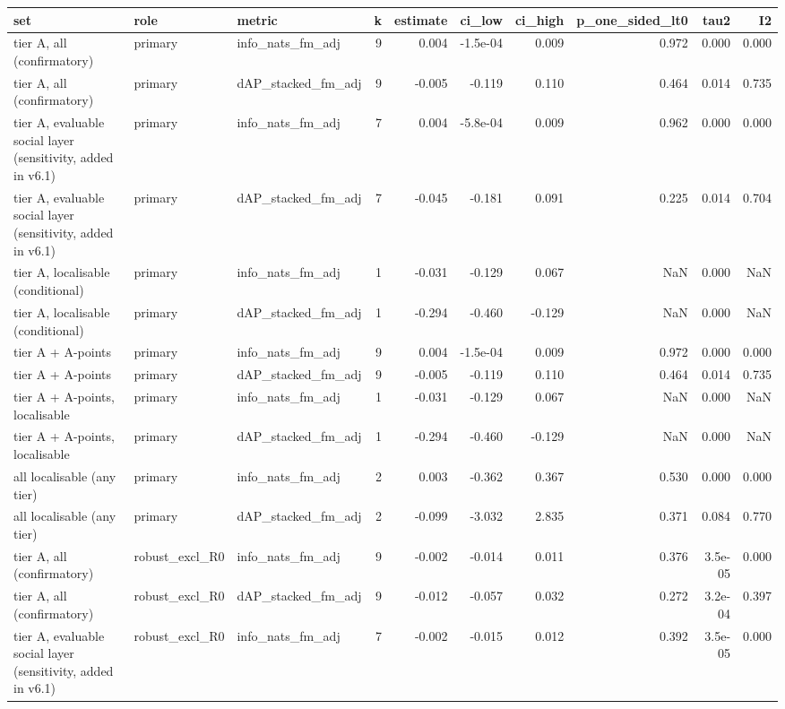 \begin{tabular}{lllrrrrrrr}
\toprule
set & role & metric & k & estimate & ci_low & ci_high & p_one_sided_lt0 & tau2 & I2 \\
\midrule
tier A, all (confirmatory) & primary & info\_nats\_fm\_adj & 9 & 0.004 & -1.5e-04 & 0.009 & 0.972 & 0.000 & 0.000 \\
tier A, all (confirmatory) & primary & dAP\_stacked\_fm\_adj & 9 & -0.005 & -0.119 & 0.110 & 0.464 & 0.014 & 0.735 \\
tier A, evaluable social layer (sensitivity, added in v6.1) & primary & info\_nats\_fm\_adj & 7 & 0.004 & -5.8e-04 & 0.009 & 0.962 & 0.000 & 0.000 \\
tier A, evaluable social layer (sensitivity, added in v6.1) & primary & dAP\_stacked\_fm\_adj & 7 & -0.045 & -0.181 & 0.091 & 0.225 & 0.014 & 0.704 \\
tier A, localisable (conditional) & primary & info\_nats\_fm\_adj & 1 & -0.031 & -0.129 & 0.067 & NaN & 0.000 & NaN \\
tier A, localisable (conditional) & primary & dAP\_stacked\_fm\_adj & 1 & -0.294 & -0.460 & -0.129 & NaN & 0.000 & NaN \\
tier A + A-points & primary & info\_nats\_fm\_adj & 9 & 0.004 & -1.5e-04 & 0.009 & 0.972 & 0.000 & 0.000 \\
tier A + A-points & primary & dAP\_stacked\_fm\_adj & 9 & -0.005 & -0.119 & 0.110 & 0.464 & 0.014 & 0.735 \\
tier A + A-points, localisable & primary & info\_nats\_fm\_adj & 1 & -0.031 & -0.129 & 0.067 & NaN & 0.000 & NaN \\
tier A + A-points, localisable & primary & dAP\_stacked\_fm\_adj & 1 & -0.294 & -0.460 & -0.129 & NaN & 0.000 & NaN \\
all localisable (any tier) & primary & info\_nats\_fm\_adj & 2 & 0.003 & -0.362 & 0.367 & 0.530 & 0.000 & 0.000 \\
all localisable (any tier) & primary & dAP\_stacked\_fm\_adj & 2 & -0.099 & -3.032 & 2.835 & 0.371 & 0.084 & 0.770 \\
tier A, all (confirmatory) & robust\_excl\_R0 & info\_nats\_fm\_adj & 9 & -0.002 & -0.014 & 0.011 & 0.376 & 3.5e-05 & 0.000 \\
tier A, all (confirmatory) & robust\_excl\_R0 & dAP\_stacked\_fm\_adj & 9 & -0.012 & -0.057 & 0.032 & 0.272 & 3.2e-04 & 0.397 \\
tier A, evaluable social layer (sensitivity, added in v6.1) & robust\_excl\_R0 & info\_nats\_fm\_adj & 7 & -0.002 & -0.015 & 0.012 & 0.392 & 3.5e-05 & 0.000 \\

\end{tabular}
